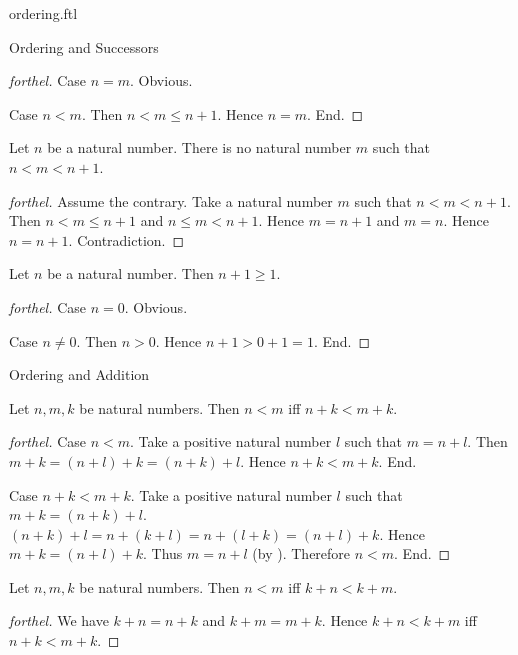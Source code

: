 \documentclass{naproche-library}
\begin{document}
\begin{smodule}[title=The Standard Ordering of the Natural Numbers]{ordering.ftl}
\begin{sfragment}{Ordering and Successors}
\begin{proof}[forthel]
    Case $n = m$. Obvious.

    Case $n < m$.
      Then $n < m \leq n + 1$.
      Hence $n = m$.
    End.
  \end{proof}

  \begin{corollary}[forthel,id=ARITHMETIC_04_1802826644717568]
    Let $n$ be a natural number.
    There is no natural number $m$ such that $n < m < n + 1$.
  \end{corollary}
  \begin{proof}[forthel]
    Assume the contrary.
    Take a natural number $m$ such that $n < m < n + 1$.
    Then $n < m \leq n + 1$ and $n \leq m < n + 1$.
    Hence $m = n + 1$ and $m = n$.
    Hence $n = n + 1$.
    Contradiction.
  \end{proof}

  \begin{proposition}[forthel,id=ARITHMETIC_04_990407185924096]
    Let $n$ be a natural number.
    Then $n + 1 \geq 1$.
  \end{proposition}
  \begin{proof}[forthel]
    Case $n = 0$. Obvious.

    Case $n \neq 0$.
      Then $n > 0$.
      Hence $n + 1 > 0 + 1 = 1$.
    End.
  \end{proof}
\end{sfragment}

\begin{sfragment}{Ordering and Addition}
  \begin{proposition}[forthel,id=ARITHMETIC_04_7354062662008832]
    Let $n, m, k$ be natural numbers.
    Then $n < m$ iff $n + k < m + k$.
  \end{proposition}
  \begin{proof}[forthel]
    Case $n < m$.
      Take a positive natural number $l$ such that $m = n + l$.
      Then $m + k
        = (n + l) + k
        = (n + k) + l$.
      Hence $n + k < m + k$.
    End.

    Case $n + k < m + k$.
      Take a positive natural number $l$ such that $m + k = (n + k) + l$.
      $(n + k) + l
        = n + (k + l)
        = n + (l + k)
        = (n + l) + k$.
      Hence $m + k = (n + l) + k$.
      Thus $m = n + l$ (by ).
      Therefore $n < m$.
    End.
  \end{proof}

  \begin{corollary}[forthel,id=ARITHMETIC_04_1901366129721344]
    Let $n, m, k$ be natural numbers.
    Then $n < m$ iff $k + n < k + m$.
  \end{corollary}
  \begin{proof}[forthel]
    We have $k + n = n + k$ and $k + m = m + k$.
    Hence $k + n < k + m$ iff $n + k < m + k$.
  \end{proof}


\end{sfragment}
\end{smodule}
\end{document}
